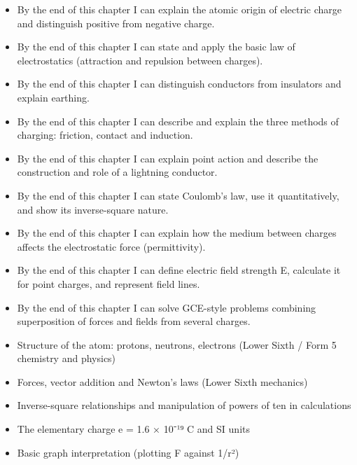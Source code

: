 \documentclass[11pt]{article}
\begin{document}
\begin{objectifs}
\begin{itemize}
\item By the end of this chapter I can explain the atomic origin of electric charge and distinguish positive from negative charge.
\item By the end of this chapter I can state and apply the basic law of electrostatics (attraction and repulsion between charges).
\item By the end of this chapter I can distinguish conductors from insulators and explain earthing.
\item By the end of this chapter I can describe and explain the three methods of charging: friction, contact and induction.
\item By the end of this chapter I can explain point action and describe the construction and role of a lightning conductor.
\item By the end of this chapter I can state Coulomb's law, use it quantitatively, and show its inverse-square nature.
\item By the end of this chapter I can explain how the medium between charges affects the electrostatic force (permittivity).
\item By the end of this chapter I can define electric field strength E, calculate it for point charges, and represent field lines.
\item By the end of this chapter I can solve GCE-style problems combining superposition of forces and fields from several charges.
\end{itemize}
\end{objectifs}

\begin{prerequis}
\begin{itemize}
\item Structure of the atom: protons, neutrons, electrons (Lower Sixth / Form 5 chemistry and physics)
\item Forces, vector addition and Newton's laws (Lower Sixth mechanics)
\item Inverse-square relationships and manipulation of powers of ten in calculations
\item The elementary charge e = 1.6 × 10⁻¹⁹ C and SI units
\item Basic graph interpretation (plotting F against 1/r²)
\end{itemize}
\end{prerequis}

\newpage
\end{document}
